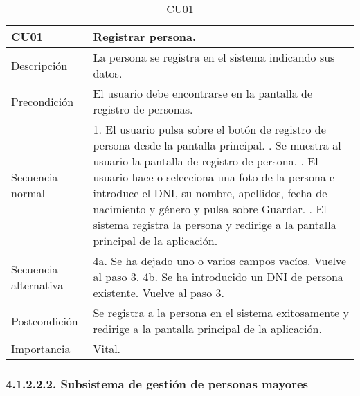 \begin{table}[H]
\label{CU01}
\begin{center}
\begin{tabular}{| l | p{10cm} |}
\hline
CU01 & Registrar persona.\\
\hline
Descripción & La persona se registra en el sistema indicando sus datos.\\
\hline
Precondición & El usuario debe encontrarse en la pantalla de registro de personas.\\
\hline
Secuencia normal & 1. El usuario pulsa sobre el botón de registro de persona desde la pantalla principal.
\newline 2. Se muestra al usuario la pantalla de registro de persona.
\newline 3. El usuario hace o selecciona una foto de la persona e introduce el DNI, su nombre, apellidos, fecha de nacimiento y género y pulsa sobre Guardar.
\newline 4. El sistema registra la persona y redirige a la pantalla principal de la aplicación.\\
\hline
Secuencia alternativa & 4a. Se ha dejado uno o varios campos vacíos. Vuelve al paso 3.
\newline 4b. Se ha introducido un DNI de persona existente. Vuelve al paso 3.\\
\hline
Postcondición & Se registra a la persona en el sistema exitosamente y redirige a la pantalla principal de la aplicación.\\
\hline
Importancia & Vital.\\
\hline
\end{tabular}
\end{center}
\caption{CU01}
\end{table} 

\subsubsection{4.1.2.2.2. Subsistema de gestión de personas mayores}


